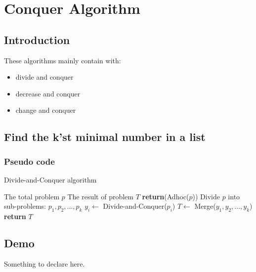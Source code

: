\documentclass[cs4size, punct, nospace, fancyhdr, fntef]{ctexart}
\begin{document}
  \section{Conquer Algorithm}

    \subsection{Introduction}
      These algorithms mainly contain with:
      \begin{itemize}
        \item divide and conquer
        \item decrease and conquer
        \item change and conquer
      \end{itemize}
      
    \subsection{Find the k'st minimal number in a list}
      \subsubsection{Pseudo code}
        \begin{algorithm}
        \caption{Divide-and-Conquer algorithm}\label{dnc}
        \begin{algorithmic}[1] %
        \Require The total problem $p$
        \Ensure The result of problem $T$
            \State \textbf{return}(Adhoc($p$))
          \EndIf
          \State Divide $p$ into sub-problems: ${p_1, p_2, ..., p_k}$
            \State $y_i\gets$ Divide-and-Conquer($p_i$)
          \EndFor
          \State $T\gets$ Merge($y_1, y_2, ..., y_k$)
          \State \textbf{return} $T$
        \EndFunction
        \end{algorithmic}
        \end{algorithm}
        
    \subsection{Demo}
      Something to declare here.
\end{document}
